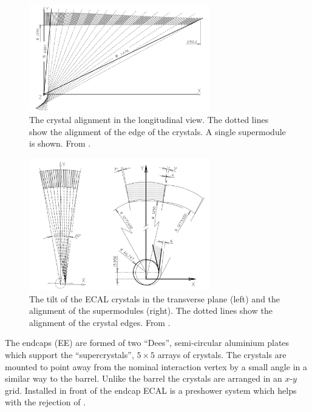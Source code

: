 \begin{figure}[p]
  \centering
  \includegraphics[width=0.7\textwidth]{crystallong}
  \caption[The crystal alignment in the longitudinal view.]{The crystal
alignment in the longitudinal view. The dotted lines show the alignment of the
edge of the crystals. A single supermodule is shown. From \cite{ecal1997technical}.}
  \label{fig:crystallong}
\end{figure}

\begin{figure}[p]
  \centering
  \includegraphics[width=0.7\textwidth]{crystaltilt}
  \caption[The tilt of the ECAL crystals in the transverse plane and the
alignment of the supermodules.] {The tilt of the ECAL crystals in the transverse
plane (left) and the alignment of the supermodules (right). The dotted lines
show the alignment of the crystal edges. From \cite{ecal1997technical}.}
  \label{fig:crystaltilt}
\end{figure}

The endcaps (EE) are formed of two ``Dees'', semi-circular aluminium plates
which support the ``supercrystals'', $5\times5$ arrays of crystals. The crystals are
mounted to point away from the nominal interaction vertex by a small angle in a similar way
to the barrel. 
Unlike the barrel the crystals are arranged in an $x$-$y$ grid.
Installed in front of the endcap ECAL is a preshower system which helps with
the rejection of \Ppizero \cite{chatrchyan2008cms}.

